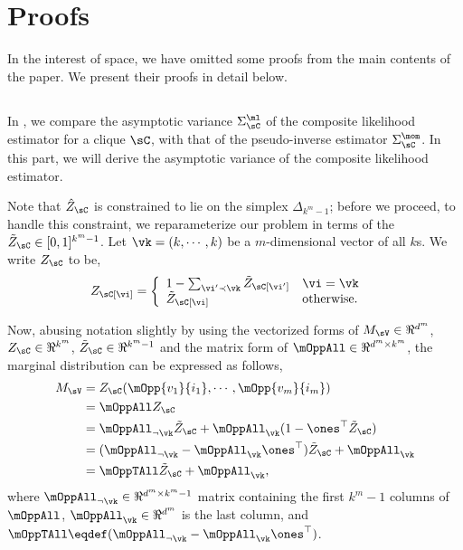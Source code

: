 \section{Proofs}
\label{app:proofs}

In the interest of space, we have omitted some proofs from
the main contents of the paper. 
We present their proofs in detail below.

\subsection{}
\label{app:pw-variance-proof}

In , we compare the asymptotic variance
  $\Sigma^\ml_\sC$ of the composite likelihood estimator for a clique
  $\sC$, with that of the pseudo-inverse estimator $\Sigma^\mom_\sC$. 
In this part, we will derive the asymptotic variance of the composite
  likelihood estimator.

Note that $\hat Z_\sC$ is constrained to lie on the simplex
$\Delta_{k^m-1}$; before we proceed, to handle this constraint, we
reparameterize our problem in terms of the $\tilde Z_\sC \in
[0,1]^{k^m-1}$. 
Let $\vk = (k, \cdots, k)$ be a $m$-dimensional vector of all $k$s. We
write $Z_\sC$ to be,
\begin{align*}
  Z_\sC[\vi] &= \left\{
    \begin{array}{ll}
      1 - \sum_{\vi' \prec \vk} \tilde Z_\sC[\vi'] & \vi = \vk \\
      \tilde Z_\sC[\vi] & \text{otherwise.}
      \end{array}
      \right.
\end{align*}

Now, abusing notation slightly by using the vectorized forms of $M_\sV
\in \Re^{d^m}$, $Z_\sC \in \Re^{k^m}$, $\tilde Z_\sC \in \Re^{k^m-1}$
and the matrix form of $\mOppAll \in \Re^{d^m \times k^m}$, the marginal
distribution can be expressed as follows,
\begin{align*}
  M_\sV &= Z_\sC( \mOpp{v_1}{i_1}, \cdots, \mOpp{v_m}{i_m} ) \\
        &= \mOppAll Z_\sC \\
        &= \mOppAll_{\neg \vk} \tilde Z_\sC + \mOppAll_{\vk} (1 - \ones^\top \tilde Z_\sC) \\
        &= (\mOppAll_{\neg \vk} -  \mOppAll_{\vk}\ones^\top) \tilde Z_\sC + \mOppAll_{\vk} \\
        &= \mOppTAll \tilde Z_\sC + \mOppAll_{\vk},
\end{align*}
where $\mOppAll_{\neg \vk} \in \Re^{d^m \times k^m - 1}$ matrix containing the
first $k^m-1$ columns of $\mOppAll$, $\mOppAll_\vk \in \Re^{d^m}$ is the
last column, and $\mOppTAll \eqdef (\mOppAll_{\neg \vk}
- \mOppAll_{\vk}\ones^\top)$.

